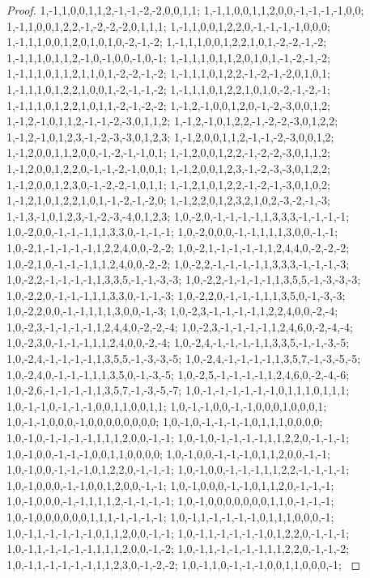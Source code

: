 \documentclass{article}
\begin{document}
\begin{proof}
{{1,-1,1,0,0,1,1,2,-1,-1,-2,-2,0,0,1,1; 1,-1,1,0,0,1,1,2,0,0,-1,-1,-1,-1,0,0; 1,-1,1,0,0,1,2,2,-1,-2,-2,-2,0,1,1,1; 1,-1,1,0,0,1,2,2,0,-1,-1,-1,-1,0,0,0; 1,-1,1,1,0,0,1,2,0,1,0,1,0,-2,-1,-2; 1,-1,1,1,0,0,1,2,2,1,0,1,-2,-2,-1,-2; 1,-1,1,1,0,1,1,2,-1,0,-1,0,0,-1,0,-1; 1,-1,1,1,0,1,1,2,0,1,0,1,-1,-2,-1,-2; 1,-1,1,1,0,1,1,2,1,1,0,1,-2,-2,-1,-2; 1,-1,1,1,0,1,2,2,-1,-2,-1,-2,0,1,0,1; 1,-1,1,1,0,1,2,2,1,0,0,1,-2,-1,-1,-2; 1,-1,1,1,0,1,2,2,1,0,1,0,-2,-1,-2,-1;
1,-1,1,1,0,1,2,2,1,0,1,1,-2,-1,-2,-2; 1,-1,2,-1,0,0,1,2,0,-1,-2,-3,0,0,1,2; 1,-1,2,-1,0,1,1,2,-1,-1,-2,-3,0,1,1,2; 1,-1,2,-1,0,1,2,2,-1,-2,-2,-3,0,1,2,2; 1,-1,2,-1,0,1,2,3,-1,-2,-3,-3,0,1,2,3; 1,-1,2,0,0,1,1,2,-1,-1,-2,-3,0,0,1,2; 1,-1,2,0,0,1,1,2,0,0,-1,-2,-1,-1,0,1; 1,-1,2,0,0,1,2,2,-1,-2,-2,-3,0,1,1,2; 1,-1,2,0,0,1,2,2,0,-1,-1,-2,-1,0,0,1; 1,-1,2,0,0,1,2,3,-1,-2,-3,-3,0,1,2,2; 1,-1,2,0,0,1,2,3,0,-1,-2,-2,-1,0,1,1; 1,-1,2,1,0,1,2,2,-1,-2,-1,-3,0,1,0,2;
1,-1,2,1,0,1,2,2,1,0,1,-1,-2,-1,-2,0; 1,-1,2,2,0,1,2,3,2,1,0,2,-3,-2,-1,-3; 1,-1,3,-1,0,1,2,3,-1,-2,-3,-4,0,1,2,3; 1,0,-2,0,-1,-1,-1,-1,1,3,3,3,-1,-1,-1,-1; 1,0,-2,0,0,-1,-1,-1,1,1,3,3,0,-1,-1,-1; 1,0,-2,0,0,0,-1,-1,1,1,1,3,0,0,-1,-1; 1,0,-2,1,-1,-1,-1,-1,1,2,2,4,0,0,-2,-2; 1,0,-2,1,-1,-1,-1,-1,1,2,4,4,0,-2,-2,-2; 1,0,-2,1,0,-1,-1,-1,1,1,2,4,0,0,-2,-2; 1,0,-2,2,-1,-1,-1,-1,1,3,3,3,-1,-1,-1,-3; 1,0,-2,2,-1,-1,-1,-1,1,3,3,5,-1,-1,-3,-3; 1,0,-2,2,-1,-1,-1,-1,1,3,5,5,-1,-3,-3,-3;
1,0,-2,2,0,-1,-1,-1,1,1,3,3,0,-1,-1,-3; 1,0,-2,2,0,-1,-1,-1,1,1,3,5,0,-1,-3,-3; 1,0,-2,2,0,0,-1,-1,1,1,1,3,0,0,-1,-3; 1,0,-2,3,-1,-1,-1,-1,1,2,2,4,0,0,-2,-4; 1,0,-2,3,-1,-1,-1,-1,1,2,4,4,0,-2,-2,-4; 1,0,-2,3,-1,-1,-1,-1,1,2,4,6,0,-2,-4,-4; 1,0,-2,3,0,-1,-1,-1,1,1,2,4,0,0,-2,-4; 1,0,-2,4,-1,-1,-1,-1,1,3,3,5,-1,-1,-3,-5; 1,0,-2,4,-1,-1,-1,-1,1,3,5,5,-1,-3,-3,-5; 1,0,-2,4,-1,-1,-1,-1,1,3,5,7,-1,-3,-5,-5; 1,0,-2,4,0,-1,-1,-1,1,1,3,5,0,-1,-3,-5; 1,0,-2,5,-1,-1,-1,-1,1,2,4,6,0,-2,-4,-6;
1,0,-2,6,-1,-1,-1,-1,1,3,5,7,-1,-3,-5,-7; 1,0,-1,-1,-1,-1,-1,-1,0,1,1,1,0,1,1,1; 1,0,-1,-1,0,-1,-1,-1,0,0,1,1,0,0,1,1; 1,0,-1,-1,0,0,-1,-1,0,0,0,1,0,0,0,1; 1,0,-1,-1,0,0,0,-1,0,0,0,0,0,0,0,0; 1,0,-1,0,-1,-1,-1,-1,0,1,1,1,0,0,0,0; 1,0,-1,0,-1,-1,-1,-1,1,1,1,2,0,0,-1,-1; 1,0,-1,0,-1,-1,-1,-1,1,1,2,2,0,-1,-1,-1; 1,0,-1,0,0,-1,-1,-1,0,0,1,1,0,0,0,0; 1,0,-1,0,0,-1,-1,-1,0,1,1,2,0,0,-1,-1; 1,0,-1,0,0,-1,-1,-1,0,1,2,2,0,-1,-1,-1; 1,0,-1,0,0,-1,-1,-1,1,1,2,2,-1,-1,-1,-1;
1,0,-1,0,0,0,-1,-1,0,0,1,2,0,0,-1,-1; 1,0,-1,0,0,0,-1,-1,0,1,1,2,0,-1,-1,-1; 1,0,-1,0,0,0,-1,-1,1,1,1,2,-1,-1,-1,-1; 1,0,-1,0,0,0,0,0,0,0,1,1,0,-1,-1,-1; 1,0,-1,0,0,0,0,0,0,1,1,1,-1,-1,-1,-1; 1,0,-1,1,-1,-1,-1,-1,0,1,1,1,0,0,0,-1; 1,0,-1,1,-1,-1,-1,-1,0,1,1,2,0,0,-1,-1; 1,0,-1,1,-1,-1,-1,-1,0,1,2,2,0,-1,-1,-1; 1,0,-1,1,-1,-1,-1,-1,1,1,1,2,0,0,-1,-2; 1,0,-1,1,-1,-1,-1,-1,1,1,2,2,0,-1,-1,-2; 1,0,-1,1,-1,-1,-1,-1,1,1,2,3,0,-1,-2,-2; 1,0,-1,1,0,-1,-1,-1,0,0,1,1,0,0,0,-1;
}}
\end{proof}
\end{document}

